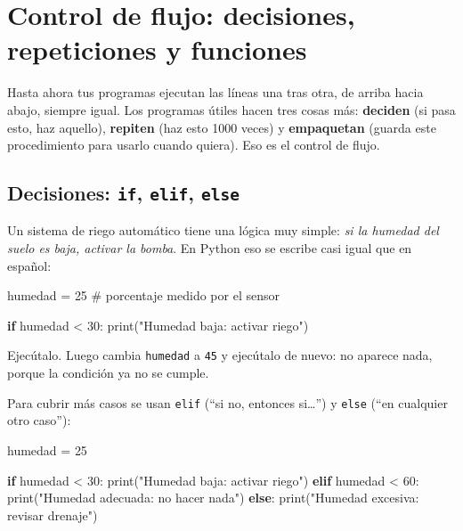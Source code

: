 \documentclass[
  spanish,
  letterpaper,
  DIV=11,
  numbers=noendperiod]{scrreprt}
\newenvironment{Shaded}{\begin{snugshade}}{\end{snugshade}}
\newcommand{\BuiltInTok}[1]{\textcolor[rgb]{0.00,0.23,0.31}{#1}}
\newcommand{\CommentTok}[1]{\textcolor[rgb]{0.37,0.37,0.37}{#1}}
\newcommand{\ControlFlowTok}[1]{\textcolor[rgb]{0.00,0.23,0.31}{\textbf{#1}}}
\newcommand{\DecValTok}[1]{\textcolor[rgb]{0.68,0.00,0.00}{#1}}
\newcommand{\NormalTok}[1]{\textcolor[rgb]{0.00,0.23,0.31}{#1}}
\newcommand{\OperatorTok}[1]{\textcolor[rgb]{0.37,0.37,0.37}{#1}}
\newcommand{\StringTok}[1]{\textcolor[rgb]{0.13,0.47,0.30}{#1}}
\begin{document}

\chapter{Control de flujo: decisiones, repeticiones y
funciones}\label{control-de-flujo-decisiones-repeticiones-y-funciones}

Hasta ahora tus programas ejecutan las líneas una tras otra, de arriba
hacia abajo, siempre igual. Los programas útiles hacen tres cosas más:
\textbf{deciden} (si pasa esto, haz aquello), \textbf{repiten} (haz esto
1000 veces) y \textbf{empaquetan} (guarda este procedimiento para usarlo
cuando quiera). Eso es el control de flujo.

\section{\texorpdfstring{Decisiones: \texttt{if}, \texttt{elif},
\texttt{else}}{Decisiones: if, elif, else}}\label{decisiones-if-elif-else}

Un sistema de riego automático tiene una lógica muy simple: \emph{si la
humedad del suelo es baja, activar la bomba}. En Python eso se escribe
casi igual que en español:

\begin{Shaded}
\begin{Highlighting}[]
\NormalTok{humedad }\OperatorTok{=} \DecValTok{25}  \CommentTok{\# porcentaje medido por el sensor}

\ControlFlowTok{if}\NormalTok{ humedad }\OperatorTok{\textless{}} \DecValTok{30}\NormalTok{:}
    \BuiltInTok{print}\NormalTok{(}\StringTok{"Humedad baja: activar riego"}\NormalTok{)}
\end{Highlighting}
\end{Shaded}

Ejecútalo. Luego cambia \texttt{humedad} a \texttt{45} y ejecútalo de
nuevo: no aparece nada, porque la condición ya no se cumple.

Para cubrir más casos se usan \texttt{elif} (``si no, entonces
si\ldots{}'') y \texttt{else} (``en cualquier otro caso''):

\begin{Shaded}
\begin{Highlighting}[]
\NormalTok{humedad }\OperatorTok{=} \DecValTok{25}

\ControlFlowTok{if}\NormalTok{ humedad }\OperatorTok{\textless{}} \DecValTok{30}\NormalTok{:}
    \BuiltInTok{print}\NormalTok{(}\StringTok{"Humedad baja: activar riego"}\NormalTok{)}
\ControlFlowTok{elif}\NormalTok{ humedad }\OperatorTok{\textless{}} \DecValTok{60}\NormalTok{:}
    \BuiltInTok{print}\NormalTok{(}\StringTok{"Humedad adecuada: no hacer nada"}\NormalTok{)}
\ControlFlowTok{else}\NormalTok{:}
    \BuiltInTok{print}\NormalTok{(}\StringTok{"Humedad excesiva: revisar drenaje"}\NormalTok{)}
\end{Highlighting}
\end{Shaded}
\end{document}
